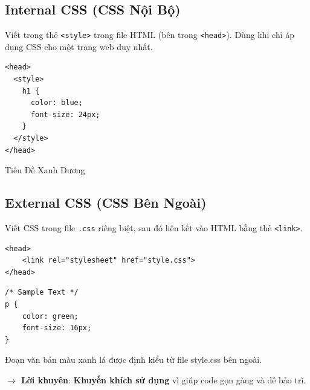 \documentclass[11pt,oneside]{book}
\newcommand{\codeinline}[1]{\textcolor{accentOrange}{\texttt{#1}}}
\begin{document}
\subsection{Internal CSS (CSS Nội Bộ)}
Viết trong thẻ \codeinline{<style>} trong file HTML (bên trong \codeinline{<head>}). Dùng khi chỉ áp dụng CSS cho một trang web duy nhất.
\begin{codeWindow}
\begin{lstlisting}[language=HTML5]
<head>
  <style>
    h1 {
      color: blue;
      font-size: 24px;
    }
  </style>
</head>
\end{lstlisting}
\end{codeWindow}

\begin{browserWindow}
\sffamily\small
\textcolor{primaryBlue}{\Large Tiêu Đề Xanh Dương}
\end{browserWindow}

\subsection{External CSS (CSS Bên Ngoài)}
Viết CSS trong file \codeinline{.css} riêng biệt, sau đó liên kết vào HTML bằng thẻ \codeinline{<link>}.
\begin{codeWindow}
\begin{lstlisting}[language=HTML5]
<head>
    <link rel="stylesheet" href="style.css">
</head>
\end{lstlisting}
\end{codeWindow}

\begin{codeWindow}
\begin{lstlisting}[language=CSS3]
/* Sample Text */
p {
    color: green;
    font-size: 16px;
}
\end{lstlisting}
\end{codeWindow}

\begin{browserWindow}
\sffamily\small
\textcolor{tipBorder}{Đoạn văn bản màu xanh lá được định kiểu từ file style.css bên ngoài.}
\end{browserWindow}
\textcolor{tipBorder}{\textbf{$\rightarrow$ Lời khuyên}}: \textcolor{primaryBlue}{\textbf{Khuyến khích sử dụng}} vì giúp code gọn gàng và dễ bảo trì.

\end{document}
